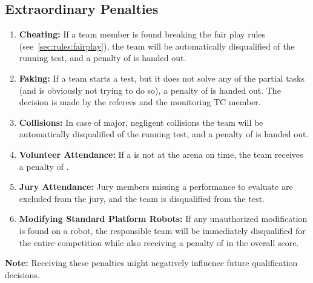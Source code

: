 \subsection{Extraordinary Penalties}
\label{sec:rules:extrapenalties}
\begin{enumerate}
	\item \textbf{Cheating:} If a team member is found breaking the fair play rules (see~\ref{sec:rules:fairplay}), the team will be automatically disqualified of the running test, and a penalty of  is handed out.

	\item \textbf{Faking:} If a team starts a test, but it does not solve any of the partial tasks (and is obviously not trying to do so), a penalty of  is handed out.
	The decision is made by the referees and the monitoring TC member.

	\item \textbf{Collisions:} In case of major, negligent collisions the team will be automatically disqualified of the running test, and a penalty of  is handed out.

	\item \textbf{Volunteer Attendance:} If a \Volunteer{} is not at the arena on time, the team receives a penalty of .
	
	\item \textbf{Jury Attendance:} Jury members missing a performance to evaluate are excluded from the jury, and the team is disqualified from the test.

	\item \textbf{Modifying Standard Platform Robots:} If any unauthorized modification is found on a \SPL{} robot, the responsible team will be immediately disqualified for the entire competition while also receiving a penalty of  in the overall score.
\end{enumerate}
\noindent\textbf{Note:} Receiving these penalties might negatively influence future qualification decisions.



